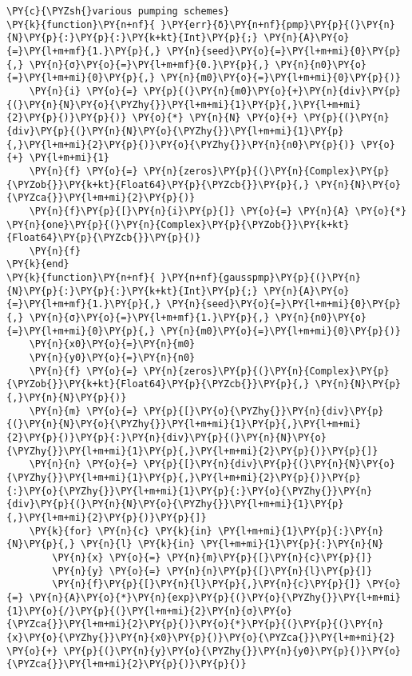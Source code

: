\begin{Verbatim}[commandchars=\\\{\}]
\PY{c}{\PYZsh{}various pumping schemes}
\PY{k}{function}\PY{n+nf}{ }\PY{err}{δ}\PY{n+nf}{pmp}\PY{p}{(}\PY{n}{N}\PY{p}{:}\PY{p}{:}\PY{k+kt}{Int}\PY{p}{;} \PY{n}{A}\PY{o}{=}\PY{l+m+mf}{1.}\PY{p}{,} \PY{n}{seed}\PY{o}{=}\PY{l+m+mi}{0}\PY{p}{,} \PY{n}{σ}\PY{o}{=}\PY{l+m+mf}{0.}\PY{p}{,} \PY{n}{n0}\PY{o}{=}\PY{l+m+mi}{0}\PY{p}{,} \PY{n}{m0}\PY{o}{=}\PY{l+m+mi}{0}\PY{p}{)}
    \PY{n}{i} \PY{o}{=} \PY{p}{(}\PY{n}{m0}\PY{o}{+}\PY{n}{div}\PY{p}{(}\PY{n}{N}\PY{o}{\PYZhy{}}\PY{l+m+mi}{1}\PY{p}{,}\PY{l+m+mi}{2}\PY{p}{)}\PY{p}{)} \PY{o}{*} \PY{n}{N} \PY{o}{+} \PY{p}{(}\PY{n}{div}\PY{p}{(}\PY{n}{N}\PY{o}{\PYZhy{}}\PY{l+m+mi}{1}\PY{p}{,}\PY{l+m+mi}{2}\PY{p}{)}\PY{o}{\PYZhy{}}\PY{n}{n0}\PY{p}{)} \PY{o}{+} \PY{l+m+mi}{1}
    \PY{n}{f} \PY{o}{=} \PY{n}{zeros}\PY{p}{(}\PY{n}{Complex}\PY{p}{\PYZob{}}\PY{k+kt}{Float64}\PY{p}{\PYZcb{}}\PY{p}{,} \PY{n}{N}\PY{o}{\PYZca{}}\PY{l+m+mi}{2}\PY{p}{)}
    \PY{n}{f}\PY{p}{[}\PY{n}{i}\PY{p}{]} \PY{o}{=} \PY{n}{A} \PY{o}{*} \PY{n}{one}\PY{p}{(}\PY{n}{Complex}\PY{p}{\PYZob{}}\PY{k+kt}{Float64}\PY{p}{\PYZcb{}}\PY{p}{)}
    \PY{n}{f}
\PY{k}{end}
\PY{k}{function}\PY{n+nf}{ }\PY{n+nf}{gausspmp}\PY{p}{(}\PY{n}{N}\PY{p}{:}\PY{p}{:}\PY{k+kt}{Int}\PY{p}{;} \PY{n}{A}\PY{o}{=}\PY{l+m+mf}{1.}\PY{p}{,} \PY{n}{seed}\PY{o}{=}\PY{l+m+mi}{0}\PY{p}{,} \PY{n}{σ}\PY{o}{=}\PY{l+m+mf}{1.}\PY{p}{,} \PY{n}{n0}\PY{o}{=}\PY{l+m+mi}{0}\PY{p}{,} \PY{n}{m0}\PY{o}{=}\PY{l+m+mi}{0}\PY{p}{)}
    \PY{n}{x0}\PY{o}{=}\PY{n}{m0}
    \PY{n}{y0}\PY{o}{=}\PY{n}{n0}
    \PY{n}{f} \PY{o}{=} \PY{n}{zeros}\PY{p}{(}\PY{n}{Complex}\PY{p}{\PYZob{}}\PY{k+kt}{Float64}\PY{p}{\PYZcb{}}\PY{p}{,} \PY{n}{N}\PY{p}{,}\PY{n}{N}\PY{p}{)}
    \PY{n}{m} \PY{o}{=} \PY{p}{[}\PY{o}{\PYZhy{}}\PY{n}{div}\PY{p}{(}\PY{n}{N}\PY{o}{\PYZhy{}}\PY{l+m+mi}{1}\PY{p}{,}\PY{l+m+mi}{2}\PY{p}{)}\PY{p}{:}\PY{n}{div}\PY{p}{(}\PY{n}{N}\PY{o}{\PYZhy{}}\PY{l+m+mi}{1}\PY{p}{,}\PY{l+m+mi}{2}\PY{p}{)}\PY{p}{]}
    \PY{n}{n} \PY{o}{=} \PY{p}{[}\PY{n}{div}\PY{p}{(}\PY{n}{N}\PY{o}{\PYZhy{}}\PY{l+m+mi}{1}\PY{p}{,}\PY{l+m+mi}{2}\PY{p}{)}\PY{p}{:}\PY{o}{\PYZhy{}}\PY{l+m+mi}{1}\PY{p}{:}\PY{o}{\PYZhy{}}\PY{n}{div}\PY{p}{(}\PY{n}{N}\PY{o}{\PYZhy{}}\PY{l+m+mi}{1}\PY{p}{,}\PY{l+m+mi}{2}\PY{p}{)}\PY{p}{]}
    \PY{k}{for} \PY{n}{c} \PY{k}{in} \PY{l+m+mi}{1}\PY{p}{:}\PY{n}{N}\PY{p}{,} \PY{n}{l} \PY{k}{in} \PY{l+m+mi}{1}\PY{p}{:}\PY{n}{N}
        \PY{n}{x} \PY{o}{=} \PY{n}{m}\PY{p}{[}\PY{n}{c}\PY{p}{]}
        \PY{n}{y} \PY{o}{=} \PY{n}{n}\PY{p}{[}\PY{n}{l}\PY{p}{]}
        \PY{n}{f}\PY{p}{[}\PY{n}{l}\PY{p}{,}\PY{n}{c}\PY{p}{]} \PY{o}{=} \PY{n}{A}\PY{o}{*}\PY{n}{exp}\PY{p}{(}\PY{o}{\PYZhy{}}\PY{l+m+mi}{1}\PY{o}{/}\PY{p}{(}\PY{l+m+mi}{2}\PY{n}{σ}\PY{o}{\PYZca{}}\PY{l+m+mi}{2}\PY{p}{)}\PY{o}{*}\PY{p}{(}\PY{p}{(}\PY{n}{x}\PY{o}{\PYZhy{}}\PY{n}{x0}\PY{p}{)}\PY{o}{\PYZca{}}\PY{l+m+mi}{2} \PY{o}{+} \PY{p}{(}\PY{n}{y}\PY{o}{\PYZhy{}}\PY{n}{y0}\PY{p}{)}\PY{o}{\PYZca{}}\PY{l+m+mi}{2}\PY{p}{)}\PY{p}{)}

\end{Verbatim}
